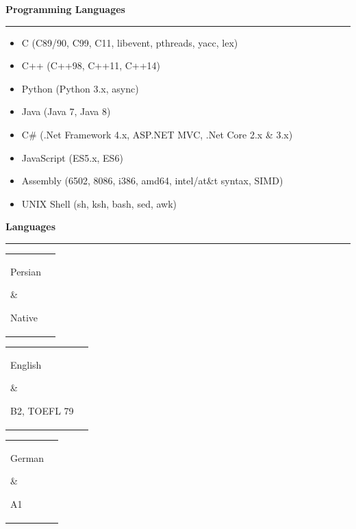 \documentclass[11pt,a4paper,oneside]{article}
\makeatletter
\renewcommand{\section}[1]{%
{\large\textbf{#1}}\\
\rule[9pt]{18cm}{.4pt}\vspace{-16pt}%
}
\newenvironment{mytable}{%
\begin{tabular}{@{}l@{\hspace{4mm}}l@{}}%
}{\end{tabular}}
\newcommand{\myitem}[2]{%
\parbox[t]{16mm}{#1}&\parbox[t]{16cm}{#2}\\%
}
\makeatother
\begin{document}
\section{Programming Languages}
\begin{itemize}
\item C (C89/90, C99, C11, libevent, pthreads, yacc, lex)
\item C++ (C++98, C++11, C++14)
\item Python (Python 3.x, async)
\item Java (Java 7, Java 8)
\item C\# (.Net Framework 4.x, ASP.NET MVC, .Net Core 2.x \& 3.x)
\item JavaScript (ES5.x, ES6)
\item Assembly (6502, 8086, i386, amd64, intel/at\&t syntax, SIMD)
\item UNIX Shell (sh, ksh, bash, sed, awk)
\end{itemize}

\section{Languages}

\begin{mytable}\myitem{Persian}{
	Native
}\end{mytable}

\begin{mytable}\myitem{English}{
	B2, TOEFL 79
}\end{mytable}

\begin{mytable}\myitem{German}{
	A1
}\end{mytable}
\end{document}
